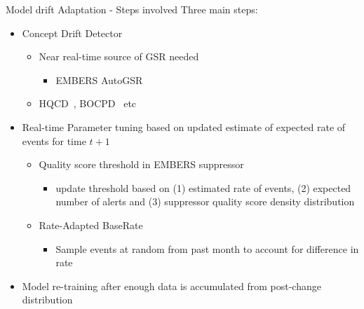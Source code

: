 \begin{frame}{Model drift Adaptation - Steps involved}
Three main steps:
\begin{itemize}
    \item Concept Drift Detector
    \begin{itemize}
        \item Near real-time source of GSR needed
            \begin{itemize}
                \item EMBERS AutoGSR~\cite{saraf2016embers}
            \end{itemize}
        \item HQCD~\cite{chakraborty2016hierarchical}, BOCPD~\cite{adams2007bayesian} etc
    \end{itemize} \pause
    \item Real-time Parameter tuning based on updated estimate of expected rate of events for time $t+1$
    \begin{itemize}
        \item Quality score threshold in EMBERS suppressor
            \begin{itemize}
                \item update threshold based on (1) estimated rate of events, (2) expected number of alerts and (3) suppressor quality score density distribution
            \end{itemize}\pause
        \item Rate-Adapted BaseRate
        \begin{itemize}
            \item Sample events at random from past month to account for difference in rate
        \end{itemize}
    \end{itemize}\pause
    \item Model re-training after enough data is accumulated from post-change distribution
\end{itemize}
    
\end{frame}

